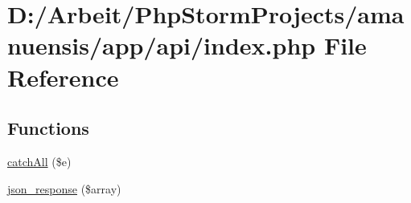 \hypertarget{a00082}{}\section{D\+:/\+Arbeit/\+Php\+Storm\+Projects/amanuensis/app/api/index.php File Reference}
\label{a00082}
\subsection*{Functions}
\begin{DoxyCompactItemize}
\item 
\hyperlink{a00082_a2a4d0fc0c8817862d5c0c4769c909fa3}{catch\+All} (\$e)
\item 
\hyperlink{a00082_a289e5852ae9a348e1a0ef87aa3ce1c8c}{json\+\_\+response} (\$array)
\end{DoxyCompactItemize}
